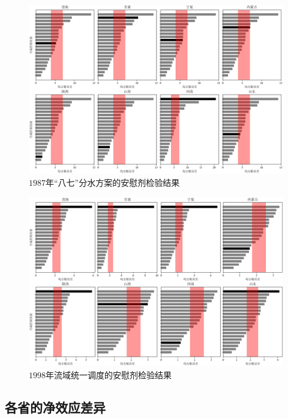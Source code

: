 \begin{figure}
    \includegraphics[width=0.9\linewidth]{img/ch5/ch5_rmse_87.png}
    \centering
    \caption{$1987$年“八七”分水方案的安慰剂检验结果}\label{fig:87placebo}
\end{figure}

\begin{figure}
    \includegraphics[width=0.9\linewidth]{img/ch5/ch5_rmse_98.png}
    \centering
    \caption{$1998$年流域统一调度的安慰剂检验结果}\label{fig:98placebo}
\end{figure}


\subsection{各省的净效应差异}\label{result-3}

